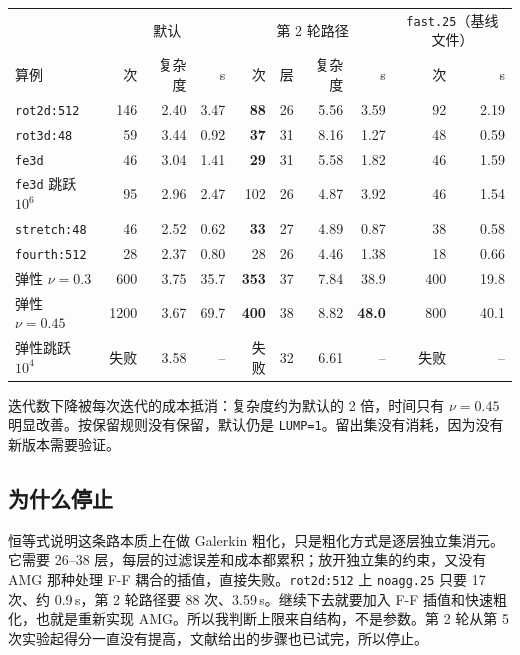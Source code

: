 \documentclass[11pt,a4paper]{ctexart}
\begin{document}
\begin{table}[H]
\centering\footnotesize\setlength{\tabcolsep}{5pt}
\begin{tabular}{lrrrrrrrrr}
\toprule
 & \multicolumn{3}{c}{默认} & \multicolumn{4}{c}{第 2 轮路径} & \multicolumn{2}{c}{\texttt{fast.25}（基线文件）} \\
算例 & 次 & 复杂度 & s & 次 & 层 & 复杂度 & s & 次 & s \\
\midrule
\texttt{rot2d:512} & 146 & 2.40 & 3.47 & \textbf{88} & 26 & 5.56 & 3.59 & 92 & 2.19 \\
\texttt{rot3d:48} & 59 & 3.44 & 0.92 & \textbf{37} & 31 & 8.16 & 1.27 & 48 & 0.59 \\
\texttt{fe3d} & 46 & 3.04 & 1.41 & \textbf{29} & 31 & 5.58 & 1.82 & 46 & 1.59 \\
\texttt{fe3d} 跳跃 $10^6$ & 95 & 2.96 & 2.47 & 102 & 26 & 4.87 & 3.92 & 46 & 1.54 \\
\texttt{stretch:48} & 46 & 2.52 & 0.62 & \textbf{33} & 27 & 4.89 & 0.87 & 38 & 0.58 \\
\texttt{fourth:512} & 28 & 2.37 & 0.80 & 28 & 26 & 4.46 & 1.38 & 18 & 0.66 \\
弹性 $\nu=0.3$ & 600 & 3.75 & 35.7 & \textbf{353} & 37 & 7.84 & 38.9 & 400 & 19.8 \\
弹性 $\nu=0.45$ & 1200 & 3.67 & 69.7 & \textbf{400} & 38 & 8.82 & \textbf{48.0} & 800 & 40.1 \\
弹性跳跃 $10^4$ & 失败 & 3.58 & -- & 失败 & 32 & 6.61 & -- & 失败 & -- \\
\bottomrule
\end{tabular}
\end{table}

迭代数下降被每次迭代的成本抵消：复杂度约为默认的 2 倍，时间只有 $\nu=0.45$ 明显改善。按保留规则没有保留，默认仍是 \texttt{LUMP=1}。留出集没有消耗，因为没有新版本需要验证。

\subsection{为什么停止}
恒等式说明这条路本质上在做 Galerkin 粗化，只是粗化方式是逐层独立集消元。它需要 26--38 层，每层的过滤误差和成本都累积；放开独立集的约束，又没有 AMG 那种处理 F-F 耦合的插值，直接失败。\texttt{rot2d:512} 上 \texttt{noagg.25} 只要 17 次、约 0.9\,s，第 2 轮路径要 88 次、3.59\,s。继续下去就要加入 F-F 插值和快速粗化，也就是重新实现 AMG。所以我判断上限来自结构，不是参数。第 2 轮从第 5 次实验起得分一直没有提高，文献给出的步骤也已试完，所以停止。
\end{document}
